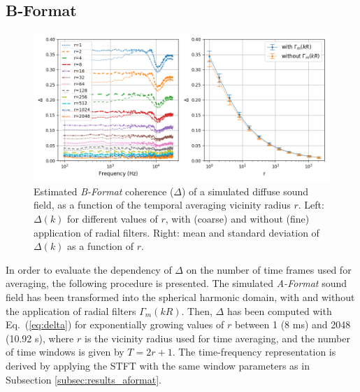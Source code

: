 \subsection{B-Format} 
\begin{figure}
	\includegraphics[width=\textwidth]{Figures/CoherenceEstimation/Figure2}
	\caption{\label{fig:Fig2} Estimated \textit{B-Format} coherence ($\Delta$) of a simulated diffuse sound field, as a function of the temporal averaging vicinity radius $r$. Left: $\Delta(k)$ for different values of $r$, with (coarse) and without (fine) application of radial filters. Right: mean and standard deviation of $\Delta(k)$ as a function of $r$.}
\end{figure}

In order to evaluate the dependency of $\Delta$ on the number of time frames used for averaging, the following procedure is presented.
The simulated \textit{A-Format} sound field has been transformed into the spherical harmonic domain, with and without the application of radial filters $\Gamma_m(kR)$. Then, $\Delta$ has been computed with Eq.~(\ref{eq:delta}) for exponentially growing values of $r$ between 1 (8 ms) and 2048 (10.92 s), where $r$ is the vicinity radius used for time averaging, and the number of time windows is given by $T = 2r+1$.
The time-frequency representation is derived by applying the STFT with the same window parameters as in Subsection \ref{subsec:results_aformat}.\\

